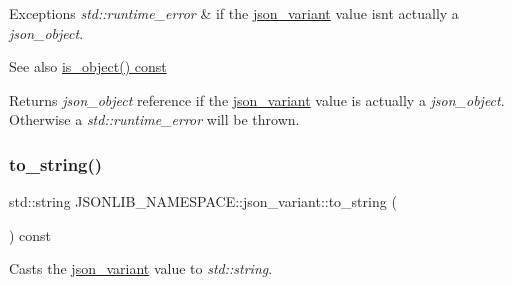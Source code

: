 \begin{DoxyExceptions}{Exceptions}
{\em std\+::runtime\+\_\+error} & if the \hyperlink{classJSONLIB__NAMESPACE_1_1json__variant}{json\+\_\+variant} value isn\textquotesingle{}t actually a {\itshape json\+\_\+object}. \\
\hline
\end{DoxyExceptions}
\begin{DoxySeeAlso}{See also}
\hyperlink{classJSONLIB__NAMESPACE_1_1json__variant_a28b4156626bd9f0e344ba1704c7590f3}{is\+\_\+object() const} 
\end{DoxySeeAlso}
\begin{DoxyReturn}{Returns}
{\itshape json\+\_\+object} reference if the \hyperlink{classJSONLIB__NAMESPACE_1_1json__variant}{json\+\_\+variant} value is actually a {\itshape json\+\_\+object}. Otherwise a {\itshape std\+::runtime\+\_\+error} will be thrown. 
\end{DoxyReturn}
\mbox{\label{classJSONLIB__NAMESPACE_1_1json__variant_a6bbb59173d134b69cded2d3da3a1b70f}} 
\subsubsection{\texorpdfstring{to\+\_\+string()}{to\_string()}}
{\footnotesize\ttfamily std\+::string J\+S\+O\+N\+L\+I\+B\+\_\+\+N\+A\+M\+E\+S\+P\+A\+C\+E\+::json\+\_\+variant\+::to\+\_\+string (\begin{DoxyParamCaption}{ }\end{DoxyParamCaption}) const}



Casts the \hyperlink{classJSONLIB__NAMESPACE_1_1json__variant}{json\+\_\+variant} value to {\itshape std\+::string}. 


